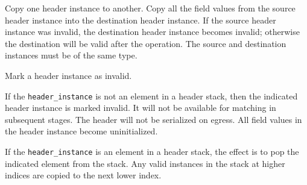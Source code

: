 \documentclass[12pt]{article}
\begin{document}

{ %
Copy one header instance to another.
}
{ %
}
{ %
Copy all the field values from the source header instance into the destination 
header instance. If the source header instance was invalid, the destination 
header instance becomes invalid; otherwise the destination will be valid 
after the operation. The source and destination instances must be of the 
same type.
}


{ %
Mark a header instance as invalid.
}
{ %
}
{ %
If the \texttt{header_instance} is not an element in a header stack, then the indicated 
header instance is marked invalid. It will not be available for matching in 
subsequent \matchaction stages. The header will not be serialized on egress. 
All field values in the header instance become uninitialized.

If the \texttt{header_instance} is an element in a header stack, the effect is to 
pop the indicated element from the stack. Any valid instances in the stack 
at higher indices are copied to the next lower index.
}

\end{document}
